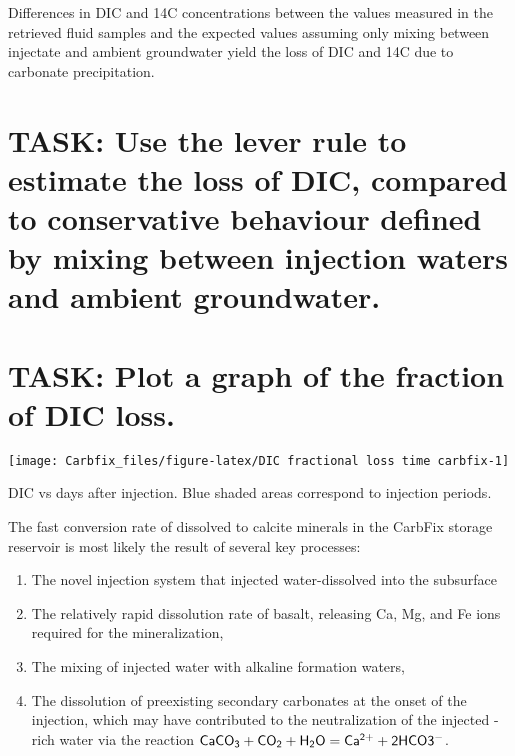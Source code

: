 \documentclass[nofonts,x11names]{tufte-handout}
\begin{document}
\noindent Differences in DIC and 14C concentrations between the values
measured in the retrieved fluid samples and the expected values assuming
only mixing between injectate and ambient groundwater yield the loss of
DIC and 14C due to carbonate precipitation.

\section{TASK: Use the lever rule to estimate the loss of DIC, compared
to conservative behaviour defined by mixing between injection waters and
ambient
groundwater.}\label{task-use-the-lever-rule-to-estimate-the-loss-of-dic-compared-to-conservative-behaviour-defined-by-mixing-between-injection-waters-and-ambient-groundwater.}

\section{TASK: Plot a graph of the fraction of DIC
loss.}\label{task-plot-a-graph-of-the-fraction-of-dic-loss.}

\begin{marginfigure}[-1cm]
\texttt{[image: Carbfix\_files/figure-latex/DIC fractional loss time carbfix-1]} \caption[DIC vs days after injection]{DIC vs days after injection.  Blue shaded areas correspond to injection periods.}\label{fig:DIC fractional loss time carbfix}
\end{marginfigure}

The fast conversion rate of dissolved  to calcite minerals in
the CarbFix storage reservoir is most likely the result of several key
processes:

\begin{enumerate}
\item The novel  injection system that injected water-dissolved  into the subsurface
\item The relatively rapid dissolution rate of basalt, releasing Ca, Mg, and Fe ions required for the  mineralization,
\item The mixing of injected water with alkaline formation waters,
\item The dissolution of preexisting secondary carbonates at the onset of the  injection, which may have contributed to the neutralization of the injected -rich water via the reaction $\sf CaCO_3 + CO_2 + H_2O = Ca^{2+} + 2 HCO3^-$.
\end{enumerate}
\end{document}
